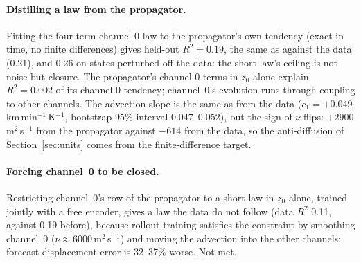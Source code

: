\documentclass[11pt]{article}
\begin{document}
\paragraph{Distilling a law from the propagator.} Fitting the four-term channel-0 law to the propagator's own tendency (exact in time, no finite differences) gives held-out $R^2 = 0.19$, the same as against the data (0.21), and 0.26 on states perturbed off the data: the short law's ceiling is not noise but closure. The propagator's channel-0 terms in $z_0$ alone explain $R^2 = 0.002$ of its channel-0 tendency; channel~0's evolution runs through coupling to other channels. The advection slope is the same as from the data ($c_1 = +0.049$\,km\,min$^{-1}$\,K$^{-1}$, bootstrap 95\% interval 0.047--0.052), but the sign of $\nu$ flips: $+2900$\,m$^2$\,s$^{-1}$ from the propagator against $-614$ from the data, so the anti-diffusion of Section~\ref{sec:units} comes from the finite-difference target.

\paragraph{Forcing channel~0 to be closed.} Restricting channel~0's row of the propagator to a short law in $z_0$ alone, trained jointly with a free encoder, gives a law the data do not follow (data $R^2$ 0.11, against 0.19 before), because rollout training satisfies the constraint by smoothing channel~0 ($\nu \approx 6000$\,m$^2$\,s$^{-1}$) and moving the advection into the other channels; forecast displacement error is 32--37\% worse. Not met.
\end{document}

